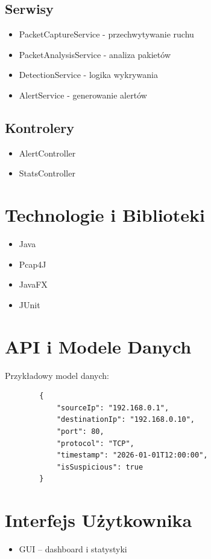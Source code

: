 \documentclass[a4paper,12pt]{article}
\begin{document}
	\subsection*{Serwisy}
	\begin{itemize}
		\item PacketCaptureService - przechwytywanie ruchu
		\item PacketAnalysisService - analiza pakietów
		\item DetectionService - logika wykrywania
		\item AlertService - generowanie alertów
	\end{itemize}
	
	\subsection*{Kontrolery}
	\begin{itemize}
		\item AlertController
		\item StatsController
	\end{itemize}
	
	\section{Technologie i Biblioteki}
	\begin{itemize}
		\item Java
		\item Pcap4J
		\item JavaFX
		\item JUnit
	\end{itemize}
	
	\section{API i Modele Danych}
	Przykładowy model danych:
	
	\begin{verbatim}
		{
			"sourceIp": "192.168.0.1",
			"destinationIp": "192.168.0.10",
			"port": 80,
			"protocol": "TCP",
			"timestamp": "2026-01-01T12:00:00",
			"isSuspicious": true
		}
	\end{verbatim}
	
	\section{Interfejs Użytkownika}
	\begin{itemize}
		\item GUI – dashboard i statystyki
	\end{itemize}
	
\end{document}
